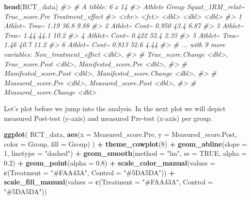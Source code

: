 \documentclass[
]{book}
\newenvironment{Shaded}{\begin{snugshade}}{\end{snugshade}}
\newcommand{\CommentTok}[1]{\textcolor[rgb]{0.56,0.35,0.01}{\textit{#1}}}
\newcommand{\DataTypeTok}[1]{\textcolor[rgb]{0.13,0.29,0.53}{#1}}
\newcommand{\DecValTok}[1]{\textcolor[rgb]{0.00,0.00,0.81}{#1}}
\newcommand{\FloatTok}[1]{\textcolor[rgb]{0.00,0.00,0.81}{#1}}
\newcommand{\KeywordTok}[1]{\textcolor[rgb]{0.13,0.29,0.53}{\textbf{#1}}}
\newcommand{\NormalTok}[1]{#1}
\newcommand{\OperatorTok}[1]{\textcolor[rgb]{0.81,0.36,0.00}{\textbf{#1}}}
\newcommand{\OtherTok}[1]{\textcolor[rgb]{0.56,0.35,0.01}{#1}}
\newcommand{\StringTok}[1]{\textcolor[rgb]{0.31,0.60,0.02}{#1}}
\begin{document}
\begin{Shaded}
\begin{Highlighting}[]
\KeywordTok{head}\NormalTok{(RCT\_data)}
\CommentTok{\#> \# A tibble: 6 x 14}
\CommentTok{\#>   Athlete Group Squat\_1RM\_relat\textasciitilde{} True\_score.Pre Treatment\_effect}
\CommentTok{\#>   <chr>   <fct>            <dbl>          <dbl>            <dbl>}
\CommentTok{\#> 1 Athlet\textasciitilde{} Trea\textasciitilde{}            1.19            36.8             9.88}
\CommentTok{\#> 2 Athlet\textasciitilde{} Cont\textasciitilde{}            0.950           43.4             6.87}
\CommentTok{\#> 3 Athlet\textasciitilde{} Trea\textasciitilde{}            1.44            44.1            10.2 }
\CommentTok{\#> 4 Athlet\textasciitilde{} Cont\textasciitilde{}            0.422           52.4             2.33}
\CommentTok{\#> 5 Athlet\textasciitilde{} Trea\textasciitilde{}            1.46            40.7            11.2 }
\CommentTok{\#> 6 Athlet\textasciitilde{} Cont\textasciitilde{}            0.813           52.6             4.44}
\CommentTok{\#> \# ... with 9 more variables: Non\_treatment\_effect <dbl>,}
\CommentTok{\#> \#   True\_score.Change <dbl>, True\_score.Post <dbl>, Manifested\_score.Pre <dbl>,}
\CommentTok{\#> \#   Manifested\_score.Post <dbl>, Manifested\_score.Change <dbl>,}
\CommentTok{\#> \#   Measured\_score.Pre <dbl>, Measured\_score.Post <dbl>,}
\CommentTok{\#> \#   Measured\_score.Change <dbl>}
\end{Highlighting}
\end{Shaded}

Let's plot before we jump into the analysis. In the next plot we will depict measured Post-test (y-axis) and measured Pre-test (x-axis) per group.

\begin{Shaded}
\begin{Highlighting}[]
\KeywordTok{ggplot}\NormalTok{(}
\NormalTok{  RCT\_data,}
  \KeywordTok{aes}\NormalTok{(}\DataTypeTok{x =}\NormalTok{ Measured\_score.Pre, }\DataTypeTok{y =}\NormalTok{ Measured\_score.Post, }\DataTypeTok{color =}\NormalTok{ Group, }\DataTypeTok{fill =}\NormalTok{ Group)}
\NormalTok{) }\OperatorTok{+}
\StringTok{  }\KeywordTok{theme\_cowplot}\NormalTok{(}\DecValTok{8}\NormalTok{) }\OperatorTok{+}
\StringTok{  }\KeywordTok{geom\_abline}\NormalTok{(}\DataTypeTok{slope =} \DecValTok{1}\NormalTok{, }\DataTypeTok{linetype =} \StringTok{"dashed"}\NormalTok{) }\OperatorTok{+}
\StringTok{  }\KeywordTok{geom\_smooth}\NormalTok{(}\DataTypeTok{method =} \StringTok{"lm"}\NormalTok{, }\DataTypeTok{se =} \OtherTok{TRUE}\NormalTok{, }\DataTypeTok{alpha =} \FloatTok{0.2}\NormalTok{) }\OperatorTok{+}
\StringTok{  }\KeywordTok{geom\_point}\NormalTok{(}\DataTypeTok{alpha =} \FloatTok{0.8}\NormalTok{) }\OperatorTok{+}
\StringTok{  }\KeywordTok{scale\_color\_manual}\NormalTok{(}\DataTypeTok{values =} \KeywordTok{c}\NormalTok{(}\DataTypeTok{Treatment =} \StringTok{"\#FAA43A"}\NormalTok{, }\DataTypeTok{Control =} \StringTok{"\#5DA5DA"}\NormalTok{)) }\OperatorTok{+}
\StringTok{  }\KeywordTok{scale\_fill\_manual}\NormalTok{(}\DataTypeTok{values =} \KeywordTok{c}\NormalTok{(}\DataTypeTok{Treatment =} \StringTok{"\#FAA43A"}\NormalTok{, }\DataTypeTok{Control =} \StringTok{"\#5DA5DA"}\NormalTok{))}
\end{Highlighting}
\end{Shaded}
\end{document}

